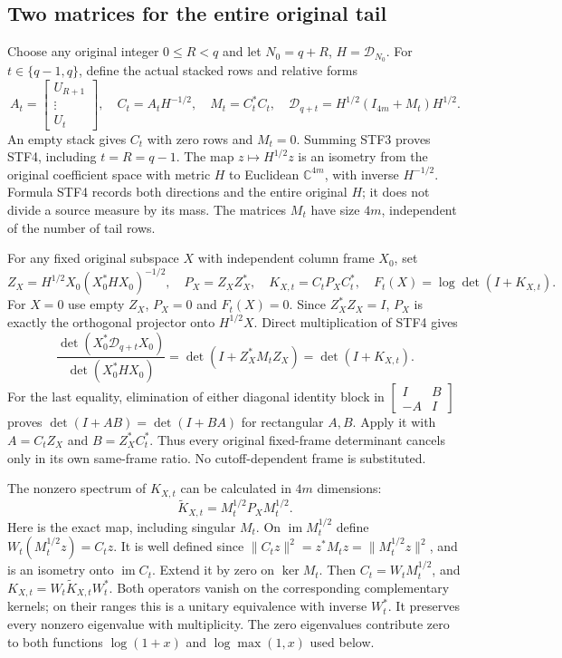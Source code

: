 \subsection{Two matrices for the entire original tail}
Choose any original integer $0\le R<q$ and let
$N_0=q+R$, $H=\mathcal D_{N_0}$.
For $t\in\{q-1,q\}$, define the actual stacked rows and relative forms
\[
 A_t=\begin{bmatrix}U_{R+1}\\ \vdots\\ U_t\end{bmatrix},
 \quad C_t=A_tH^{-1/2},\quad M_t=C_t^*C_t,
 \quad \mathcal D_{q+t}=H^{1/2}(I_{4m}+M_t)H^{1/2}.          \tag{STF4}
\]
An empty stack gives $C_t$ with zero rows and $M_t=0$.
Summing STF3 proves STF4, including $t=R=q-1$.
The map $z\mapsto H^{1/2}z$ is an isometry from the original
coefficient space with metric $H$ to Euclidean $\mathbb C^{4m}$,
with inverse $H^{-1/2}$. Formula STF4 records both directions and
the entire original $H$; it does not divide a source measure by its mass.
The matrices $M_t$ have size $4m$, independent of the number of tail rows.

For any fixed original subspace $X$ with independent column frame $X_0$,
set
\[
 Z_X=H^{1/2}X_0(X_0^*HX_0)^{-1/2},\quad
 P_X=Z_XZ_X^*,\quad K_{X,t}=C_tP_XC_t^*,\quad
 F_t(X)=\log\det(I+K_{X,t}).                              \tag{STF5}
\]
For $X=0$ use empty $Z_X$, $P_X=0$ and $F_t(X)=0$.
Since $Z_X^*Z_X=I$, $P_X$ is exactly the orthogonal projector onto
$H^{1/2}X$. Direct multiplication of STF4 gives
\[
 \frac{\det(X_0^*\mathcal D_{q+t}X_0)}{\det(X_0^*HX_0)}
 =\det(I+Z_X^*M_tZ_X)=\det(I+K_{X,t}).                    \tag{STF6}
\]
For the last equality, elimination of either diagonal identity block in
$\left[\begin{smallmatrix}I&B\\-A&I\end{smallmatrix}\right]$
proves $\det(I+AB)=\det(I+BA)$ for rectangular $A,B$.
Apply it with $A=C_tZ_X$ and $B=Z_X^*C_t^*$.
Thus every original fixed-frame determinant cancels only in its own
same-frame ratio. No cutoff-dependent frame is substituted.

The nonzero spectrum of $K_{X,t}$ can be calculated in $4m$ dimensions:
\[
             \widetilde K_{X,t}=M_t^{1/2}P_XM_t^{1/2}.     \tag{STF7}
\]
Here is the exact map, including singular $M_t$. On
$\operatorname{im}M_t^{1/2}$ define
$W_t(M_t^{1/2}z)=C_tz$. It is well defined since
$\|C_tz\|^2=z^*M_tz=\|M_t^{1/2}z\|^2$, and is an isometry onto
$\operatorname{im}C_t$. Extend it by zero on $\ker M_t$.
Then $C_t=W_tM_t^{1/2}$, and
$K_{X,t}=W_t\widetilde K_{X,t}W_t^*$.
Both operators vanish on the corresponding complementary kernels;
on their ranges this is a unitary equivalence with inverse $W_t^*$.
It preserves every nonzero eigenvalue with multiplicity. The zero
eigenvalues contribute zero to both functions $\log(1+x)$ and
$\log\max(1,x)$ used below.

